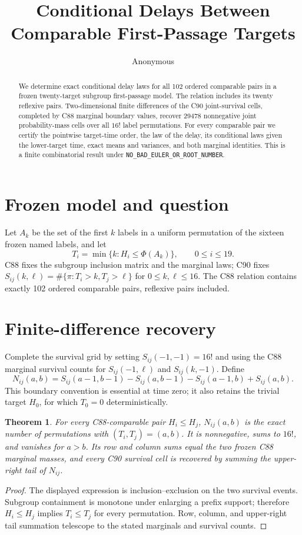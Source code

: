 \documentclass[10pt]{article}
\title{Conditional Delays Between Comparable First-Passage Targets}
\author{Anonymous}
\date{}
\newtheorem{theorem}{Theorem}
\begin{document}
\maketitle
\begin{abstract}
We determine exact conditional delay laws for all 102 ordered comparable
pairs in a frozen twenty-target subgroup first-passage model.  The relation
includes its twenty reflexive pairs.  Two-dimensional finite differences of
the C90 joint-survival cells, completed by C88 marginal boundary values,
recover 29478 nonnegative joint probability-mass cells over all $16!$ label
permutations.  For every comparable pair we certify the pointwise target-time
order, the law of the delay, its conditional laws given the lower-target
time, exact means and variances, and both marginal identities.  This is a
finite combinatorial result under
\texttt{NO\_BAD\_EULER\_OR\_ROOT\_NUMBER}.
\end{abstract}

\section{Frozen model and question}
Let $A_k$ be the set of the first $k$ labels in a uniform permutation of the
sixteen frozen named labels, and let
\[
 T_i=\min\{k:H_i\leq\Phi(A_k)\},\qquad 0\leq i\leq19.
\]
C88 fixes the subgroup inclusion matrix and the marginal laws; C90 fixes
$S_{ij}(k,\ell)=\#\{\pi:T_i>k,T_j>\ell\}$ for
$0\leq k,\ell\leq16$.  The C88 relation contains exactly 102 ordered
comparable pairs, reflexive pairs included.

\section{Finite-difference recovery}
Complete the survival grid by setting $S_{ij}(-1,-1)=16!$ and using the C88
marginal survival counts for $S_{ij}(-1,\ell)$ and $S_{ij}(k,-1)$.  Define
\[
 N_{ij}(a,b)=S_{ij}(a-1,b-1)-S_{ij}(a,b-1)
              -S_{ij}(a-1,b)+S_{ij}(a,b).
\]
This boundary convention is essential at time zero; it also retains the
trivial target $H_0$, for which $T_0=0$ deterministically.

\begin{theorem}
For every C88-comparable pair $H_i\leq H_j$, $N_{ij}(a,b)$ is the exact
number of permutations with $(T_i,T_j)=(a,b)$.  It is nonnegative, sums to
$16!$, and vanishes for $a>b$.  Its row and column sums equal the two frozen
C88 marginal masses, and every C90 survival cell is recovered by summing the
upper-right tail of $N_{ij}$.
\end{theorem}
\begin{proof}
The displayed expression is inclusion--exclusion on the two survival
events.  Subgroup containment is monotone under enlarging a prefix support;
therefore $H_i\leq H_j$ implies $T_i\leq T_j$ for every permutation.  Row,
column, and upper-right tail summation telescope to the stated marginals and
survival counts.
\end{proof}
\end{document}
